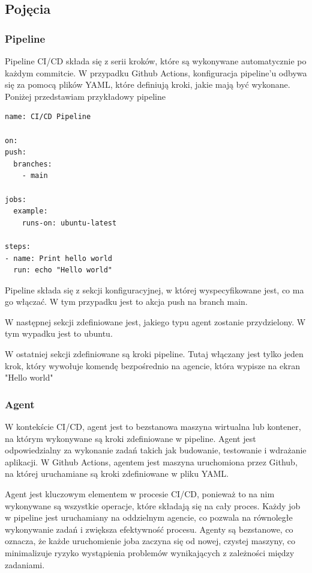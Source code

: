 \documentclass{article}
\begin{document}
\subsection{Pojęcia}

\subsubsection{Pipeline}

Pipeline CI/CD składa się z serii kroków, które są wykonywane automatycznie po każdym commitcie. W przypadku Github Actions, konfiguracja pipeline'u odbywa się za pomocą plików YAML, które definiują kroki, jakie mają być wykonane. Poniżej przedstawiam przykładowy pipeline

\begin{lstlisting}[caption=Przykładowa konfiguracja pipeline'u w Github Actions]
name: CI/CD Pipeline

on:
push:
  branches:
    - main

jobs:
  example:
    runs-on: ubuntu-latest

steps:
- name: Print hello world
  run: echo "Hello world"

\end{lstlisting}

Pipeline składa się z sekcji konfiguracyjnej, w której wyspecyfikowane jest, co ma go włączać. W tym przypadku jest to akcja push na branch main.

W następnej sekcji zdefiniowane jest, jakiego typu agent zostanie przydzielony. W tym wypadku jest to ubuntu.

W ostatniej sekcji zdefiniowane są kroki pipeline. Tutaj włączany jest tylko jeden krok, który wywołuje komendę bezpośrednio na agencie, która wypisze na ekran "Hello world"

\subsubsection{Agent}

W kontekście CI/CD, agent jest to bezstanowa maszyna wirtualna lub kontener, na którym wykonywane są kroki zdefiniowane w pipeline. Agent jest odpowiedzialny za wykonanie zadań takich jak budowanie, testowanie i wdrażanie aplikacji. W Github Actions, agentem jest maszyna uruchomiona przez Github, na której uruchamiane są kroki zdefiniowane w pliku YAML.

Agent jest kluczowym elementem w procesie CI/CD, ponieważ to na nim wykonywane są wszystkie operacje, które składają się na cały proces. Każdy job w pipeline jest uruchamiany na oddzielnym agencie, co pozwala na równoległe wykonywanie zadań i zwiększa efektywność procesu. Agenty są bezstanowe, co oznacza, że każde uruchomienie joba zaczyna się od nowej, czystej maszyny, co minimalizuje ryzyko wystąpienia problemów wynikających z zależności między zadaniami.
\end{document}
